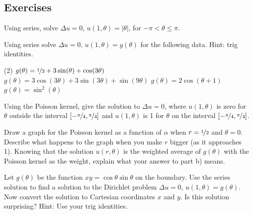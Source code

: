 \subsection{Exercises}

\begin{exercise}
Using series, solve
$\Delta u = 0$, $u(1,\theta) = \lvert \theta \rvert$, for $-\pi < \theta
\leq \pi$.
\end{exercise}

\begin{exercise}
Using series solve $\Delta u = 0$, $u(1,\theta) = g(\theta)$ for the
following data.  Hint: trig identities.
\begin{tasks}(2)
\task
$g(\theta) = 
\nicefrac{1}{2} + 3\sin(\theta) + \cos(3\theta)$
\task
$g(\theta) = 
3\cos(3\theta) + 3\sin(3\theta) + \sin(9\theta)$
\task
$g(\theta) = 2 \cos(\theta+1)$
\task
$g(\theta) = \sin^2(\theta)$
\end{tasks}
\end{exercise}

\begin{exercise}
Using the Poisson kernel, give the solution to
$\Delta u = 0$, where $u(1,\theta)$ is zero for $\theta$ outside
the interval $[-\nicefrac{\pi}{4},\nicefrac{\pi}{4}]$ and 
$u(1,\theta)$ is 1 for $\theta$ on the interval
$[-\nicefrac{\pi}{4},\nicefrac{\pi}{4}]$.
\end{exercise}

\begin{exercise}
\pagebreak[2]
\leavevmode
\begin{tasks}
\task Draw a graph for the Poisson kernel as a function of $\alpha$
when $r=\nicefrac{1}{2}$ and $\theta = 0$.
\task Describe what happens to the graph when you make $r$ bigger (as it
approaches 1).
\task Knowing that the solution $u(r,\theta)$ is the weighted average
of $g(\theta)$ with the Poisson kernel as the weight, explain what your answer
to part b) means.
\end{tasks}
\end{exercise}

\begin{exercise} \label{exercise:dirichproblemxy}
Let $g(\theta)$ be the function $xy = \cos \theta \sin
\theta$ on the boundary.  Use the series solution to find a solution
to the Dirichlet problem $\Delta u = 0$, $u(1,\theta) = g(\theta)$.  Now
convert the solution to Cartesian coordinates $x$ and $y$.  Is this
solution surprising?  Hint: Use your trig identities.
\end{exercise}

